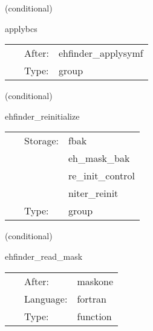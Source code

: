 \vspace{5mm}

   (conditional) 

\hspace{5mm} applybcs 

\hspace{5mm}{\it apply boundary conditions (symmetries) } 


\hspace{5mm}

 \begin{tabular*}{160mm}{cll} 
~ & After:  & ehfinder\_applysymf \\ 
~ & Type:  & group \\ 
\end{tabular*} 


\vspace{5mm}

   (conditional) 

\hspace{5mm} ehfinder\_reinitialize 

\hspace{5mm}{\it re-initialize the level set function } 


\hspace{5mm}

 \begin{tabular*}{160mm}{cll} 
~ & Storage:  & fbak \\ 
~& ~ &eh\_mask\_bak\\ 
~& ~ &re\_init\_control\\ 
~& ~ &niter\_reinit\\ 
~ & Type:  & group \\ 
\end{tabular*} 


\vspace{5mm}

   (conditional) 

\hspace{5mm} ehfinder\_read\_mask 

\hspace{5mm}{\it read in excision mask from file } 


\hspace{5mm}

 \begin{tabular*}{160mm}{cll} 
~ & After:  & maskone \\ 
~ & Language:  & fortran \\ 
~ & Type:  & function \\ 
\end{tabular*} 


